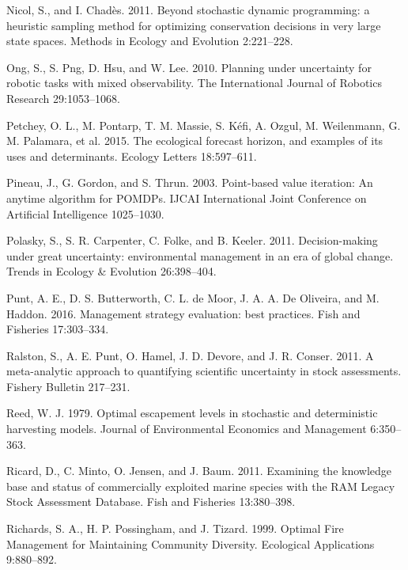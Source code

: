 \documentclass[3p]{elsarticle} %
\begin{document}
\leavevmode\hypertarget{ref-Nicol2011}{}%
Nicol, S., and I. Chadès. 2011. Beyond stochastic dynamic programming: a
heuristic sampling method for optimizing conservation decisions in very
large state spaces. Methods in Ecology and Evolution 2:221--228.

\leavevmode\hypertarget{ref-Ong2010}{}%
Ong, S., S. Png, D. Hsu, and W. Lee. 2010. Planning under uncertainty
for robotic tasks with mixed observability. The International Journal of
Robotics Research 29:1053--1068.

\leavevmode\hypertarget{ref-Petchy2015}{}%
Petchey, O. L., M. Pontarp, T. M. Massie, S. Kéfi, A. Ozgul, M.
Weilenmann, G. M. Palamara, et al. 2015. The ecological forecast
horizon, and examples of its uses and determinants. Ecology Letters
18:597--611.

\leavevmode\hypertarget{ref-Pineau2003}{}%
Pineau, J., G. Gordon, and S. Thrun. 2003. Point-based value iteration:
An anytime algorithm for POMDPs. IJCAI International Joint Conference on
Artificial Intelligence 1025--1030.

\leavevmode\hypertarget{ref-Polasky2011}{}%
Polasky, S., S. R. Carpenter, C. Folke, and B. Keeler. 2011.
Decision-making under great uncertainty: environmental management in an
era of global change. Trends in Ecology \& Evolution 26:398--404.

\leavevmode\hypertarget{ref-Punt2016}{}%
Punt, A. E., D. S. Butterworth, C. L. de Moor, J. A. A. De Oliveira, and
M. Haddon. 2016. Management strategy evaluation: best practices. Fish
and Fisheries 17:303--334.

\leavevmode\hypertarget{ref-Ralston2011}{}%
Ralston, S., A. E. Punt, O. Hamel, J. D. Devore, and J. R. Conser. 2011.
A meta-analytic approach to quantifying scientific uncertainty in stock
assessments. Fishery Bulletin 217--231.

\leavevmode\hypertarget{ref-Reed1979}{}%
Reed, W. J. 1979. Optimal escapement levels in stochastic and
deterministic harvesting models. Journal of Environmental Economics and
Management 6:350--363.

\leavevmode\hypertarget{ref-RAM}{}%
Ricard, D., C. Minto, O. Jensen, and J. Baum. 2011. Examining the
knowledge base and status of commercially exploited marine species with
the RAM Legacy Stock Assessment Database. Fish and Fisheries
13:380--398.

\leavevmode\hypertarget{ref-Richards1999}{}%
Richards, S. A., H. P. Possingham, and J. Tizard. 1999. Optimal Fire
Management for Maintaining Community Diversity. Ecological Applications
9:880--892.
\end{document}
